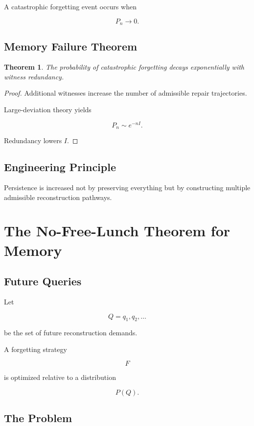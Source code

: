\documentclass[12pt,oneside]{book}
\theoremstyle{plain} \newtheorem{theorem}{Theorem}[chapter] \newtheorem{lemma}[theorem]{Lemma} \newtheorem{proposition}[theorem]{Proposition} \newtheorem{corollary}[theorem]{Corollary}
\theoremstyle{definition} \newtheorem{definition}[theorem]{Definition} \newtheorem{axiom}[theorem]{Axiom} \newtheorem{construction}[theorem]{Construction}
\theoremstyle{remark} \newtheorem{remark}[theorem]{Remark} \newtheorem{example}[theorem]{Example}
\begin{document}
A catastrophic forgetting event occurs when

\[
P_n
\rightarrow
0.
\]

\section{Memory Failure Theorem}

\begin{theorem}

The probability of catastrophic forgetting decays exponentially with witness redundancy.

\end{theorem}

\begin{proof}

Additional witnesses increase the number of admissible repair trajectories.

Large-deviation theory yields

\[
P_n
\sim
e^{-nI}.
\]

Redundancy lowers $I$.

\end{proof}

\section{Engineering Principle}

Persistence is increased not by preserving everything but by constructing multiple admissible reconstruction pathways.

\chapter{The No-Free-Lunch Theorem for Memory}

\section{Future Queries}

Let

\[
Q
=
{q_1,q_2,\ldots}
\]

be the set of future reconstruction demands.

A forgetting strategy

\[
F
\]

is optimized relative to a distribution

\[
P(Q).
\]

\section{The Problem}
\end{document}
